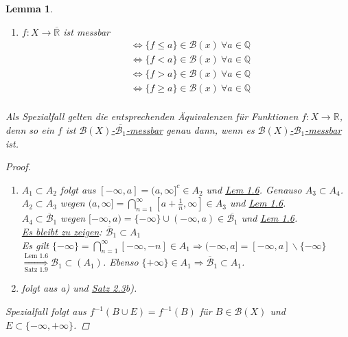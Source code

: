 \documentclass[a4paper]{scrreprt}
\newcommand{\R}{\mathbb{R}}
\newcommand{\Rq}{\overline{\R}}
\newcommand{\Q}{\mathbb{Q}}
\newcommand{\Borel}{\mathcal{B}}
\newcommand{\Borelq}{\overline{\Borel}}
\newcommand{\jshortlink}[1]{\jhyperref{#1}{\text{#1}}}
\newcommand{\jhyperref}[2]{\hyperref[j_#1]{#2}}
\newcommand{\jlink}[1]{\jhyperref{#1}{#1}}
\newcommand{\mb}[2]{\jhyperref{messbar}{#1-#2-messbar}}
\newcommand{\jabb}[3]{ #1: #2 \rightarrow #3 }
\theoremstyle{plain}
\newtheorem{lem}[thm]{Lemma}
\theoremstyle{definition}
\begin{document}
{{{\begin{lem}
\begin{enumerate}
        \item $\jabb{f}{X}{\Rq}$ ist messbar
            \begin{displaymath}
                \begin{split}
                    &\Leftrightarrow \{f \le a\} \in \Borel(x) \ \forall a\in \Q\\
                    &\Leftrightarrow \{f < a\} \in \Borel(x) \ \forall a\in \Q\\
                    &\Leftrightarrow \{f > a\} \in \Borel(x) \ \forall a\in \Q\\
                    &\Leftrightarrow \{f \ge a\} \in \Borel(x) \ \forall a\in \Q\\
                \end{split}
            \end{displaymath}
    \end{enumerate}
    Als Spezialfall gelten die entsprechenden Äquivalenzen für Funktionen $\jabb{f}{X}{\R}$, denn so ein $f$ ist \mb{$\Borel(X)$}{$\overline{{\Borel_1}}$} genau dann, wenn es \mb{$\Borel(X)$}{$\Borel_1$} ist.
    \begin{proof}
        \begin{enumerate}
            \item $A_1\subset A_2$ folgt aus $[-\infty, a] = (a,\infty]^c \in A_2$ und \jlink{Lem 1.6}. Genauso $A_3 \subset A_4$.\\
            $A_2 \subset A_3$ wegen $(a,\infty] = \bigcap_{n=1}^\infty [a+\frac{1}{n},\infty] \in A_3$ und \jlink{Lem 1.6}.\\
            $A_4 \subset \Borelq_1$ wegen $[-\infty,a) = \{-\infty\}\cup (-\infty, a) \in \overline{{\Borel_1}}$ und \jlink{Lem 1.6}.\\
            \uline{Es bleibt zu zeigen}: $\Borelq_1 \subset A_1$\\
            Es gilt $\{-\infty\} = \bigcap_{n=1}^\infty [-\infty, -n] \in A_1 \Rightarrow (-\infty,a] = [-\infty,a]\backslash \{-\infty\}$\\
            $\overset{\jshortlink{Lem 1.6}}{\underset{\jshortlink{Satz 1.9}}{\Rightarrow}} \Borel_1 \subset(A_1)$. Ebenso $\{+\infty\} \in A_1 \Rightarrow \Borelq_1 \subset A_1$.
            
            \item folgt aus a) und \jlink{Satz 2.3}b).
        \end{enumerate}
        Spezialfall folgt aus $f^{-1}(B\cup E) = f^{-1}(B)$ für $B\in \Borel(X)$ und $E \subset \{-\infty, +\infty\}$.
    \end{proof}
\end{lem}

}}}
\end{document}
